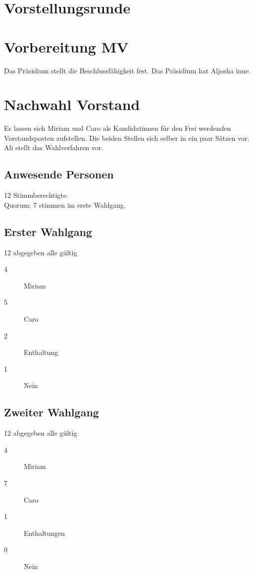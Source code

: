 \documentclass[10pt,a4paper]{article}
\begin{document}
\Titelseite

\tableofcontents
\newpage


\section{Vorstellungsrunde}

\section*{Vorbereitung MV}
Das Präsidium stellt die Beschlussfähigkeit fest. Das Präsidium hat Aljosha inne.

\section{Nachwahl Vorstand}
Es lassen sich Miriam und Caro als Kandidatinnen für den Frei werdenden Vorstandsposten aufstellen. Die beiden Stellen sich selber in ein paar Sätzen vor.\\
Ali stellt das Wahlverfahren vor. \\
\subsection*{Anwesende Personen}
12 Stimmberechtigte.\\
Quorum: 7 stimmen im erste Wahlgang. 

\subsection*{Erster Wahlgang}
12 abgegeben alle gültig

\begin{description}
\item[4] Miriam 
\item[5] Caro
\item[2] Enthaltung
\item[1] Nein
\end{description}

\subsection*{Zweiter Wahlgang}
12 abgegeben alle gültig

\begin{description}
\item[4] Miriam
\item[7] Caro
\item[1] Enthaltungen
\item[0] Nein
\end{description}
\end{document}
